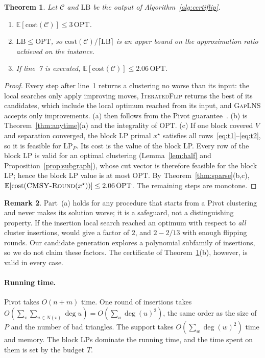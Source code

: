 \documentclass[11pt]{article}
\newtheorem{theorem}{Theorem}
\theoremstyle{definition}
\newtheorem{remark}[theorem]{Remark}
\newcommand{\OPT}{\mathrm{OPT}}
\newcommand{\cost}{\mathrm{cost}}
\newcommand{\LB}{\mathrm{LB}}
\begin{document}
\begin{theorem}\label{thm:certiflip}
Let $\mathcal C$ and $\LB$ be the output of Algorithm~\ref{alg:certiflip}.
\begin{enumerate}
\item[(a)] $\mathbb E[\cost(\mathcal C)]\le3\,\OPT$.
\item[(b)] $\LB\le\OPT$, so $\cost(\mathcal C)/\lceil\LB\rceil$ is an upper
bound on the approximation ratio achieved on the instance.
\item[(c)] If line~7 is executed, $\mathbb E[\cost(\mathcal C)]\le 2.06\,\OPT$.
\end{enumerate}
\end{theorem}
\begin{proof}
Every step after line~1 returns a clustering no worse than its input: the
local searches only apply improving moves, \textsc{IteratedFlip} returns the
best of its candidates, which include the local optimum reached from its input,
and \textsc{GapLNS} accepts only improvements.  (a) then follows from the
Pivot guarantee~\citep{AilonCN08}.  (b) is Theorem~\ref{thm:anytime}(a) and
the integrality of $\OPT$.  (c) If one block covered $V$ and separation
converged, the block LP primal $x^\star$ satisfies all
rows~\eqref{eq:t1}--\eqref{eq:t2}, so it is feasible for $\mathrm{LP}_P$.  Its
cost is the value of the block LP.  Every row of the block LP is valid for an
optimal clustering (Lemma~\ref{lem:half} and Proposition~\ref{prop:subgraph}),
whose cut vector is therefore feasible for the block LP; hence the block LP
value is at most $\OPT$.  By Theorem~\ref{thm:sparse}(b,c),
$\mathbb E[\cost(\textsc{CMSY-Round}(x^\star))]\le 2.06\,\OPT$.  The remaining
steps are monotone.
\end{proof}

\begin{remark}
Part~(a) holds for any procedure that starts from a Pivot clustering and never
makes its solution worse; it is a safeguard, not a distinguishing property.
If the insertion local search reached an optimum with respect to
\emph{all} cluster insertions, \citet{CohenAddadLPTYZ24} would give a factor of
$2$, and $2-2/13$ with enough flipping rounds.  Our candidate generation
explores a polynomial subfamily of insertions, so we do not claim these
factors.  The certificate of Theorem~\ref{thm:certiflip}(b), however, is
valid in every case.
\end{remark}

\paragraph{Running time.}  Pivot takes $O(n+m)$ time.  One round of insertions
takes $O(\sum_v\sum_{u\in N(v)}\deg u)=O(\sum_u\deg(u)^2)$, the same order as
the size of $P$ and the number of bad triangles.  The support takes
$O(\sum_w\deg(w)^2)$ time and memory.  The block LPs dominate the running
time, and the time spent on them is set by the budget $T$.
\end{document}

